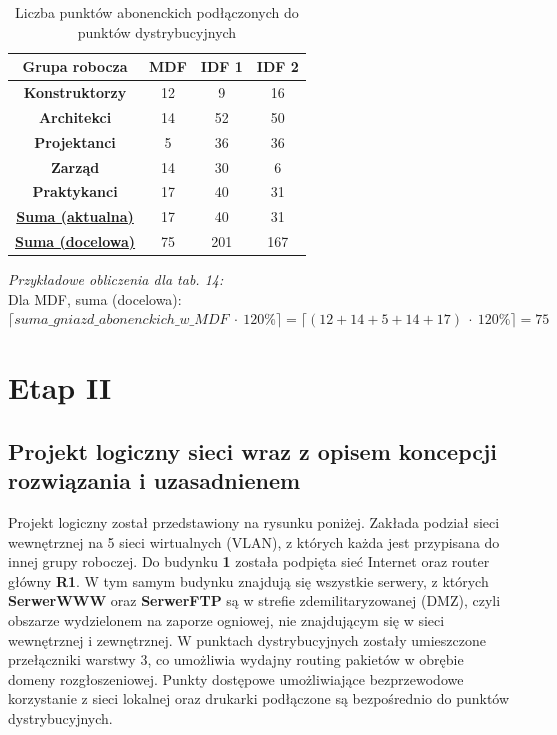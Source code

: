\documentclass[a4paper, 12pt]{article}
\begin{document}
\begin{table}[H]
	\centering
	\begin{tabular}{|c|c|c|c|}
\hline
\textbf{Grupa robocza}         & \textbf{MDF} & \textbf{IDF 1} & \textbf{IDF 2} \\ \hline
\textbf{Konstruktorzy}         & 12           & 9              & 16             \\ \hline
\textbf{Architekci}            & 14           & 52             & 50             \\ \hline
\textbf{Projektanci}           & 5            & 36             & 36             \\ \hline
\textbf{Zarząd}                & 14           & 30             & 6              \\ \hline
\textbf{Praktykanci}           & 17           & 40             & 31             \\ \hline
{\ul \textbf{Suma (aktualna)}} & 17           & 40             & 31             \\ \hline
{\ul \textbf{Suma (docelowa)}} & 75           & 201            & 167            \\ \hline
\end{tabular}
	\caption{Liczba punktów abonenckich podłączonych do punktów dystrybucyjnych}
\end{table}

\noindent \textit{Przykładowe obliczenia dla tab. 14:}\\
Dla MDF, suma (docelowa):\\
\(\lceil suma\_gniazd\_abonenckich\_w\_MDF\ \cdot\ 120\%\rceil = \lceil(12+14+5+14+17)\ \cdot\ 120\%\rceil =75\)\\

\section{Etap II}
\subsection{Projekt logiczny sieci wraz z opisem koncepcji rozwiązania i uzasadnienem}

\indent Projekt logiczny został przedstawiony na rysunku poniżej. Zakłada podział sieci wewnętrznej na 5 sieci wirtualnych (VLAN), z których każda jest przypisana do innej grupy roboczej.
\newline \indent Do budynku \textbf{1} została podpięta sieć Internet oraz router główny \textbf{R1}. W tym samym budynku znajdują się wszystkie serwery, z których \textbf{SerwerWWW} oraz \textbf{SerwerFTP} są w strefie zdemilitaryzowanej (DMZ), czyli obszarze wydzielonem na zaporze ogniowej, nie znajdującym się w sieci wewnętrznej i zewnętrznej. W punktach dystrybucyjnych zostały umieszczone przełączniki warstwy 3, co umożliwia wydajny routing pakietów w obrębie domeny rozgłoszeniowej. Punkty dostępowe umożliwiające bezprzewodowe korzystanie z sieci lokalnej oraz drukarki podłączone są bezpośrednio do punktów dystrybucyjnych.
\end{document}
